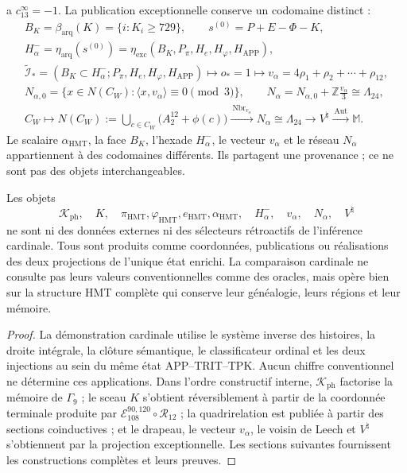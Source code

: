 a \(c_{13}^{\infty}=-1\).
La publication exceptionnelle conserve un codomaine distinct :
\[
 \begin{gathered}
 B_K=\beta_{\mathrm{arq}}(K)=\{i:K_i\ge729\},\qquad
 s^{(0)}=P+E-\Phi-K,\\
 H^-_\alpha=\eta_{\mathrm{arq}}(s^{(0)})
 =\eta_{\mathrm{exc}}(B_K,P_\pi,H_e,H_\varphi,H_{\mathrm{APP}}),\\
 \widetilde{\mathcal I}_*
 =(B_K\subset H^-_\alpha;P_\pi,H_e,H_\varphi,H_{\mathrm{APP}})
 \longmapsto o_*=1
 \longmapsto v_\alpha=4\rho_1+\rho_2+\cdots+\rho_{12},\\
 N_{\alpha,0}
 =\{x\in N(C_W):\langle x,v_\alpha\rangle\equiv0\pmod3\},\qquad
 N_\alpha=N_{\alpha,0}+\mathbb Z\frac{v_\alpha}{3}\cong\Lambda_{24},\\
 C_W\longmapsto
 N(C_W):=\bigcup_{c\in C_W}\bigl(A_2^{12}+\phi(c)\bigr)
 \xrightarrow{\ \operatorname{Nbr}_{v_\alpha}\ }
 N_\alpha\cong\Lambda_{24}
 \longrightarrow V^\natural
 \xrightarrow{\ \operatorname{Aut}\ }\mathbb M.
 \end{gathered}
\]
Le scalaire \(\alpha_{\mathrm{HMT}}\), la face \(B_K\), l’hexade
\(H^-_\alpha\), le vecteur \(v_\alpha\) et le réseau \(N_\alpha\) appartiennent
à des codomaines différents. Ils partagent une provenance ; ce ne sont pas des objets interchangeables.

\begin{proposition}
\label{ix:prop:posterioridad-testigos-ch}
Les objets
\[
 \mathcal K_{\mathrm{ph}},\quad K,\quad
 \pi_{\mathrm{HMT}},\varphi_{\mathrm{HMT}},e_{\mathrm{HMT}},
 \alpha_{\mathrm{HMT}},\quad H^-_\alpha,\quad v_\alpha,\quad
 N_\alpha,\quad V^\natural
\]
ne sont ni des données externes ni des sélecteurs rétroactifs de l’inférence cardinale.
Tous sont produits comme coordonnées, publications ou réalisations des deux
projections de l’unique état enrichi. La comparaison cardinale ne consulte pas
leurs valeurs conventionnelles comme des oracles, mais opère bien sur la structure
HMT complète qui conserve leur généalogie, leurs régions et leur mémoire.
\end{proposition}

\begin{proof}
La démonstration cardinale utilise le système inverse des histoires, la droite
intégrale, la clôture sémantique, le classificateur ordinal et les deux injections
au sein du même état APP--TRIT--TPK. Aucun chiffre conventionnel ne détermine
ces applications. Dans l’ordre constructif interne,
\(\mathcal K_{\mathrm{ph}}\) factorise la mémoire de \(\Gamma_9\) ; le sceau
\(K\) s’obtient réversiblement à partir de la coordonnée terminale produite par
\(\mathcal E_{108}^{90,120}\circ\mathcal R_{12}\) ; la
quadrirelation est publiée à partir des sections coinductives ; et le drapeau, le
vecteur \(v_\alpha\), le voisin de Leech et \(V^\natural\) s’obtiennent par la
projection exceptionnelle. Les sections suivantes fournissent les
constructions complètes et leurs preuves.
\end{proof}

